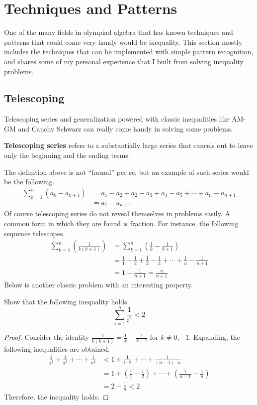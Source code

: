 \documentclass[../../../main.tex]{subfiles}
\begin{document}
\section{Techniques and Patterns}

One of the many fields in olympiad algebra that has known techniques
and patterns that could come very handy would be inequality.
This section mostly includes the techniques that can be implemented
with simple pattern recognition, and shares some of my personal
experience that I built from solving inequality problems.

\subsection{Telescoping}

Telescoping series and generalization powered with classic
inequalities like AM-GM and Cauchy Schwarz can really come handy
in solving some problems.

\begin{definition}{}{}
\textbf{Telescoping series} refers to a substantially large series
that cancels out to leave only the beginning and the ending terms.
\end{definition}

The definition above is not ``formal'' per se, but an example of such
series would be the following.
\begin{align*}
    \sum_{k=1}^n (a_k - a_{k+1})
    &= a_1 - a_2 + a_2 - a_3 + a_4 - a_5 + \cdots + a_n - a_{n+1} \\
    &= a_1 - a_{n+1}
\end{align*}
Of course telescoping series do not reveal themselves in problems
easily. A common form in which they are found is fraction.
For instance, the following sequence telescopes.
\begin{align*}
\sum_{k=1}^n \left( \frac{1}{k(k + 1)} \right)
&= \sum_{k=1}^n \left( \frac{1}{k} - \frac{1}{k + 1} \right) \\
&= \frac{1}{1} - \frac{1}{2} + \frac{1}{2} - \frac{1}{3} + \cdots
    + \frac{1}{n} - \frac{1}{n + 1} \\
&= 1 - \frac{1}{n + 1}
= \frac{n}{n + 1}
\end{align*}
Below is another classic problem with an interesting property.
\begin{problem}{}{}
Show that the following inequality holds.
\[
\sum_{i = 1}^n \frac{1}{i^2} < 2
\]
\end{problem}
\begin{proof}
Consider the identity $\frac{1}{k(k + 1)} = \frac{1}{k} -
\frac{1}{k + 1}$ for $k \neq 0, -1$. Expanding, the following
inequalities are obtained.
\begin{align*}
    \frac{1}{1^2} + \frac{1}{2^2} + \cdots + \frac{1}{n^2}
    &< 1 + \frac{1}{1 \cdot 2} + \cdots + \frac{1}{(n - 1) \cdot n} \\
    &= 1 + \left( \frac{1}{1} - \frac{1}{2} \right) + \cdots
        + \left( \frac{1}{n - 1} - \frac{1}{n} \right) \\
    &= 2 - \frac{1}{n} < 2
\end{align*}
Therefore, the inequality holds.
\end{proof}
\end{document}
